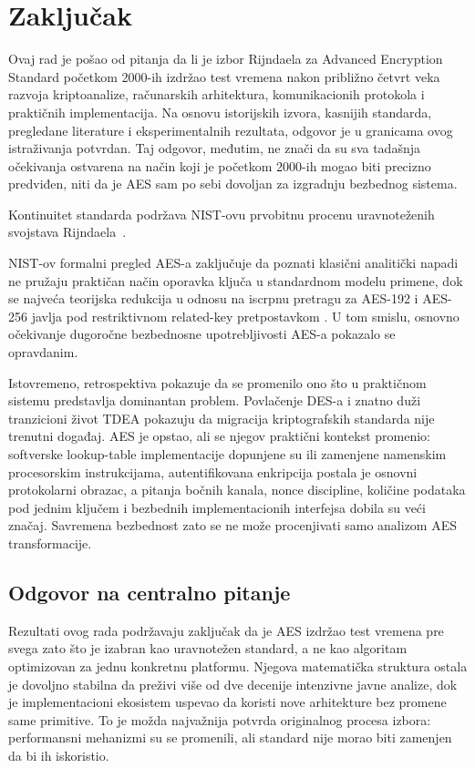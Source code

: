 \section{Zaključak}
\label{sec:zakljucak}

Ovaj rad je pošao od pitanja da li je izbor Rijndaela za Advanced
Encryption Standard početkom 2000-ih izdržao test vremena nakon približno
četvrt veka razvoja kriptoanalize, računarskih arhitektura, komunikacionih
protokola i praktičnih implementacija. Na osnovu istorijskih izvora,
kasnijih standarda, pregledane literature i eksperimentalnih rezultata,
odgovor je u granicama ovog istraživanja potvrdan. Taj odgovor, međutim,
ne znači da su sva tadašnja očekivanja ostvarena na način koji je početkom
2000-ih mogao biti precizno predviđen, niti da je AES sam po sebi dovoljan
za izgradnju bezbednog sistema.

Kontinuitet standarda podržava NIST-ovu prvobitnu procenu uravnoteženih
svojstava Rijndaela~\cite{nist-aes-report-2001,fips197-2023}.

NIST-ov formalni pregled AES-a zaključuje da
poznati klasični analitički napadi ne pružaju praktičan način oporavka
ključa u standardnom modelu primene, dok se najveća teorijska redukcija
u odnosu na iscrpnu pretragu za AES-192 i AES-256 javlja pod restriktivnom
related-key pretpostavkom
\cite{nist-ir8319}. U tom smislu, osnovno očekivanje dugoročne
bezbednosne upotrebljivosti AES-a pokazalo se opravdanim.

Istovremeno, retrospektiva pokazuje da se promenilo ono što u praktičnom
sistemu predstavlja dominantan problem. Povlačenje DES-a i
znatno duži tranzicioni život TDEA pokazuju da migracija kriptografskih standarda
nije trenutni događaj. AES je opstao, ali se njegov praktični kontekst
promenio: softverske lookup-table implementacije dopunjene su ili zamenjene
namenskim procesorskim instrukcijama, autentifikovana enkripcija postala je
osnovni protokolarni obrazac, a pitanja bočnih kanala, nonce discipline,
količine podataka pod jednim ključem i bezbednih implementacionih
interfejsa dobila su veći značaj. Savremena bezbednost zato se ne može
procenjivati samo analizom AES transformacije.

\subsection{Odgovor na centralno pitanje}

Rezultati ovog rada podržavaju zaključak da je AES izdržao test vremena
pre svega zato što je izabran kao uravnotežen standard, a ne kao algoritam
optimizovan za jednu konkretnu platformu. Njegova matematička struktura
ostala je dovoljno stabilna da preživi više od dve decenije intenzivne
javne analize, dok je implementacioni ekosistem uspevao da koristi nove
arhitekture bez promene same primitive. To je možda najvažnija potvrda
originalnog procesa izbora: performansni mehanizmi su se promenili, ali
standard nije morao biti zamenjen da bi ih iskoristio.

